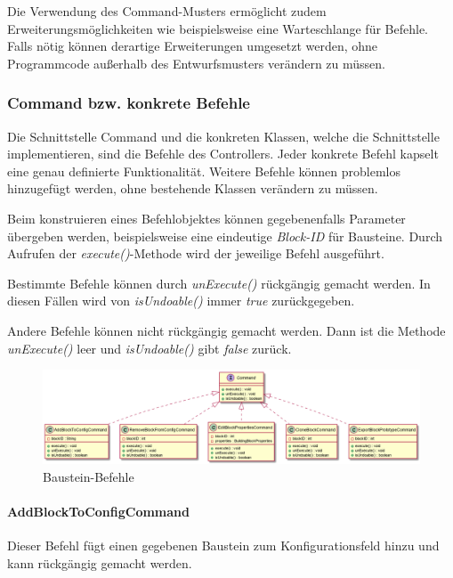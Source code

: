 \documentclass[parskip=full]{scrartcl}
\begin{document}
Die Verwendung des Command-Musters ermöglicht zudem Erweiterungsmöglichkeiten wie beispielsweise eine Warteschlange für Befehle. Falls nötig können derartige Erweiterungen umgesetzt werden, ohne Programmcode außerhalb des Entwurfsmusters verändern zu müssen.

\subsubsection{Command bzw. konkrete Befehle}

Die Schnittstelle Command und die konkreten Klassen, welche die Schnittstelle implementieren, sind die Befehle des Controllers. Jeder konkrete Befehl kapselt eine genau definierte Funktionalität. Weitere Befehle können problemlos hinzugefügt werden, ohne bestehende Klassen verändern zu müssen.

Beim konstruieren eines Befehlobjektes können gegebenenfalls Parameter übergeben werden, beispielsweise eine eindeutige \textit{Block-ID} für Bausteine. Durch Aufrufen der \textit{execute()}-Methode wird der jeweilige Befehl ausgeführt.

Bestimmte Befehle können durch \textit{unExecute()} rückgängig gemacht werden. In diesen Fällen wird von \textit{isUndoable()} immer \textit{true} zurückgegeben.

Andere Befehle können nicht rückgängig gemacht werden. Dann ist die Methode \textit{unExecute()} leer und \textit{isUndoable()} gibt \textit{false} zurück.

\begin{figure}[htbp]
	\begin{center}
		\includegraphics[width = 14cm]{Grafiken/Commands1.png}
		\caption{Baustein-Befehle}
		\label{Commands1}
	\end{center}
\end{figure}

\paragraph{AddBlockToConfigCommand}

Dieser Befehl fügt einen gegebenen Baustein zum Konfigurationsfeld hinzu und kann rückgängig gemacht werden.
\end{document}
